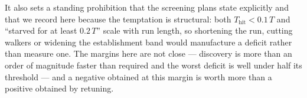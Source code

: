 It also sets a standing prohibition that the screening plans state explicitly and that we
record here because the temptation is structural: both $T_{\mathrm{hit}} < 0.1\,T$ and
``starved for at least $0.2\,T$'' scale with run length, so shortening the run, cutting
walkers or widening the establishment band would manufacture a deficit rather than measure
one. The margins here are not close --- discovery is more than an order of magnitude faster
than required and the worst deficit is well under half its threshold --- and a negative
obtained at this margin is worth more than a positive obtained by retuning.
